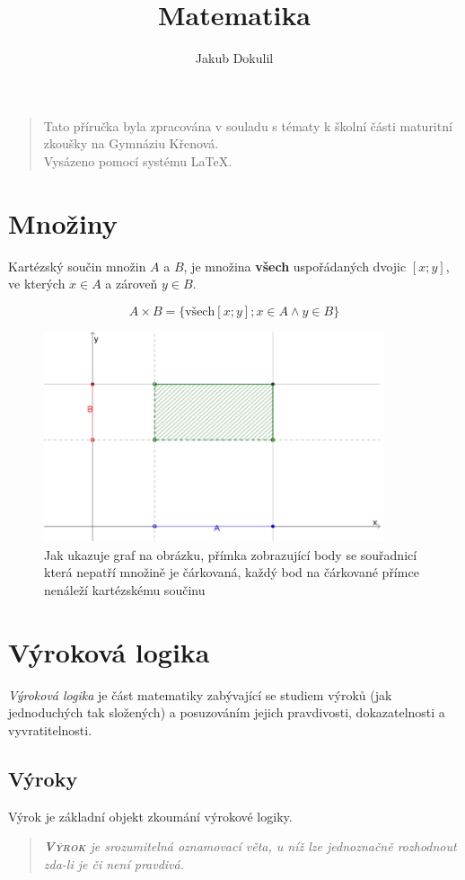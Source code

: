 \documentclass[12pt,a4wide,oneside,
headings]{report}
\author{Jakub Dokulil}
\title{Matematika}
\begin{document}
\maketitle
\begin{verse}
Tato příručka byla zpracována v souladu s tématy k školní části maturitní zkoušky na Gymnáziu Křenová.\\
Vysázeno pomocí systému \LaTeX.
\end{verse}
{}

\chapter{Množiny}
Kartézský součin množin $A$ a $B$, je množina \textbf{všech} uspořádaných dvojic $\left[ x;y \right]$, ve kterých $x \in A$ a zároveň $y\in B$.

$$ A\times B=\lbrace\mathrm{všech} \left[x;y\right]; x\in A \wedge y\in B \rbrace $$
\begin{figure}[h!]
 \includegraphics[width=10cm]{souhrn/fce/bin_soucin.pdf}
 \centering
 \caption[kartézský součin graficky]{Jak ukazuje graf na obrázku, přímka zobrazující body se souřadnicí která nepatří množině je čárkovaná, každý bod na čárkované přímce nenáleží kartézskému součinu}
\label{fig:kartsoucin}
\end{figure}



\chapter{Výroková logika}
\textit{Výroková logika} je část matematiky zabývající se studiem výroků (jak jednoduchých tak složených) a posuzováním jejich pravdivosti, dokazatelnosti a vyvratitelnosti.
\section{Výroky}
Výrok je základní objekt zkoumání výrokové logiky.\\
\begin{quote}
\textit{\textsc{\textbf{Výrok}} je srozumitelná oznamovací věta, u níž lze jednoznačně rozhodnout zda-li je či není pravdivá.}
\end{quote}
\end{document}
